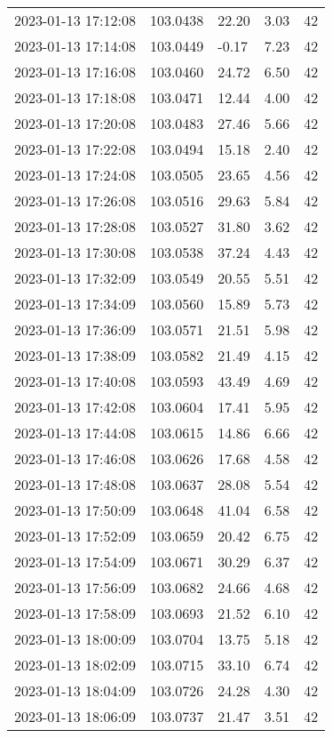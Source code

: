 \documentclass{nature_plusfigure}
\begin{document}
\begin{supplement}
\begin{center}
\begin{longtable}{lllll}
2023-01-13 17:12:08 & 103.0438 & 22.20 & 3.03 & 42 \\ 
2023-01-13 17:14:08 & 103.0449 & -0.17 & 7.23 & 42 \\ 
2023-01-13 17:16:08 & 103.0460 & 24.72 & 6.50 & 42 \\ 
2023-01-13 17:18:08 & 103.0471 & 12.44 & 4.00 & 42 \\ 
2023-01-13 17:20:08 & 103.0483 & 27.46 & 5.66 & 42 \\ 
2023-01-13 17:22:08 & 103.0494 & 15.18 & 2.40 & 42 \\ 
2023-01-13 17:24:08 & 103.0505 & 23.65 & 4.56 & 42 \\ 
2023-01-13 17:26:08 & 103.0516 & 29.63 & 5.84 & 42 \\ 
2023-01-13 17:28:08 & 103.0527 & 31.80 & 3.62 & 42 \\ 
2023-01-13 17:30:08 & 103.0538 & 37.24 & 4.43 & 42 \\ 
2023-01-13 17:32:09 & 103.0549 & 20.55 & 5.51 & 42 \\ 
2023-01-13 17:34:09 & 103.0560 & 15.89 & 5.73 & 42 \\ 
2023-01-13 17:36:09 & 103.0571 & 21.51 & 5.98 & 42 \\ 
2023-01-13 17:38:09 & 103.0582 & 21.49 & 4.15 & 42 \\ 
2023-01-13 17:40:08 & 103.0593 & 43.49 & 4.69 & 42 \\ 
2023-01-13 17:42:08 & 103.0604 & 17.41 & 5.95 & 42 \\ 
2023-01-13 17:44:08 & 103.0615 & 14.86 & 6.66 & 42 \\ 
2023-01-13 17:46:08 & 103.0626 & 17.68 & 4.58 & 42 \\ 
2023-01-13 17:48:08 & 103.0637 & 28.08 & 5.54 & 42 \\ 
2023-01-13 17:50:09 & 103.0648 & 41.04 & 6.58 & 42 \\ 
2023-01-13 17:52:09 & 103.0659 & 20.42 & 6.75 & 42 \\ 
2023-01-13 17:54:09 & 103.0671 & 30.29 & 6.37 & 42 \\ 
2023-01-13 17:56:09 & 103.0682 & 24.66 & 4.68 & 42 \\ 
2023-01-13 17:58:09 & 103.0693 & 21.52 & 6.10 & 42 \\ 
2023-01-13 18:00:09 & 103.0704 & 13.75 & 5.18 & 42 \\ 
2023-01-13 18:02:09 & 103.0715 & 33.10 & 6.74 & 42 \\ 
2023-01-13 18:04:09 & 103.0726 & 24.28 & 4.30 & 42 \\ 
2023-01-13 18:06:09 & 103.0737 & 21.47 & 3.51 & 42 \\ 

\end{longtable}
\end{center}
\end{supplement}
\end{document}
